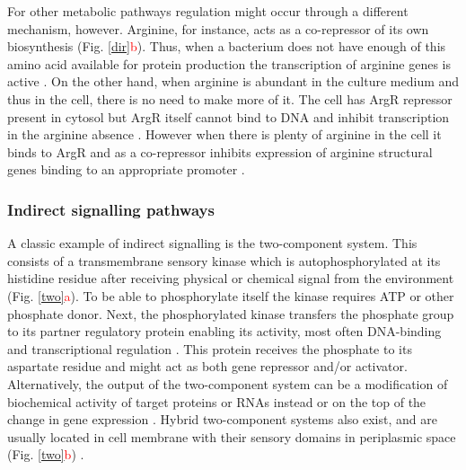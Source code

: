For other metabolic pathways regulation might occur through a different mechanism, however.
Arginine, for instance, acts as a co-repressor of its own biosynthesis (Fig. \ref{dir}\textcolor{red}{b}).
Thus, when a bacterium does not have enough of this amino acid available for protein production the transcription of arginine genes is active \cite{charlier2004biosynthesis, caldara2006arginine}.
On the other hand, when arginine is abundant in the culture medium and thus in the cell, there is no need to make more of it.
The cell has ArgR repressor present in cytosol but ArgR itself cannot bind to DNA and inhibit transcription in the arginine absence \cite{clark2005molecular, caldara2006arginine}.
However when there is plenty of arginine in the cell it binds to ArgR and as a co-repressor inhibits expression of arginine structural genes binding to an appropriate promoter \cite{charlier1992arginine, charlier2004biosynthesis, clark2005molecular}.

\subsubsection{Indirect signalling pathways}
A classic example of indirect signalling is the two-component system.
This consists of a transmembrane sensory kinase which is autophosphorylated at its histidine residue after receiving physical or chemical signal from the environment (Fig. \ref{two}\textcolor{red}{a}).
To be able to phosphorylate itself the kinase requires ATP or other phosphate donor.
Next, the phosphorylated kinase transfers the phosphate group to its partner regulatory protein enabling its activity, most often DNA-binding and transcriptional regulation \cite{lynch2012prioritization, gao2015temporal, cui2018novel}.
This protein receives the phosphate to its aspartate residue and might act as both gene repressor and/or activator.
Alternatively, the output of the two-component system can be a modification of biochemical activity of target proteins or RNAs instead or on the top of the change in gene expression \cite{shu2002antar, chambonnier2016hybrid}.
Hybrid two-component systems also exist, and are usually located in cell membrane with their sensory domains in periplasmic space (Fig. \ref{two}\textcolor{red}{b}) \cite{lynch2012prioritization, hirano2013regulon}.

